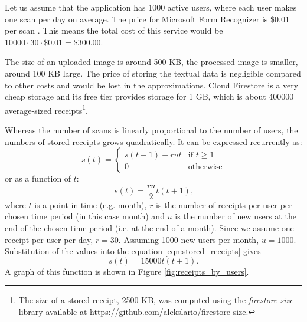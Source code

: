 \documentclass[
  digital, %
  table,   %
  oneside, %
  lof,     %
  lot,     %
]{fithesis3}
\begin{document}
Let us assume that the application has \num{1000} active users, where each user makes one scan per day on average.
The price for Microsoft Form Recognizer is \$0.01 per scan \cite{FormRecognizerPricing}. This means the total cost of this service would be $\num{10000}\cdot30\cdot\$0.01 = \$300.00$.

The size of an uploaded image is around 500 KB, the processed image is smaller, around 100 KB large. The price of storing the textual data is negligible compared to other costs and would be lost in the approximations. Cloud Firestore is a very cheap storage \cite{CloudFirestorePricing} and its free tier provides storage for 1 GB, which is about \num{400000} average-sized receipts\footnote{The size of a stored receipt, \num{2500} KB, was computed using the \textit{firestore-size} library available at \url{https://github.com/alekslario/firestore-size}.}.

Whereas the number of scans is linearly proportional to the number of users, the numbers of stored receipts grows quadratically. It can be expressed recurrently as: 
\begin{equation}
    s(t) = \begin{cases}
        s(t-1) + rut & \text{if }t\geq1\\
        0 & \text{otherwise}
    \end{cases}
\end{equation}
or as a function of $t$:
\begin{equation}
\label{eqn:stored_receipts}
s(t) = \frac{ru}{2}t(t + 1)\text{,}
\end{equation}
where $t$ is a point in time (e.g. month), $r$ is the number of receipts per user per chosen time period (in this case month) and $u$ is the number of new users at the end of the chosen time period (i.e. at the end of a month). Since we assume one receipt per user per day, $r = 30$. Assuming \num{1000} new users per month, $u = \num{1000}$. 
Substitution of the values into the equation \ref{eqn:stored_receipts} gives
\begin{equation}
s(t) = \num{15000}t(t + 1)\text{.}
\end{equation}
A graph of this function is shown in Figure \ref{fig:receipts_by_users}.
\end{document}
